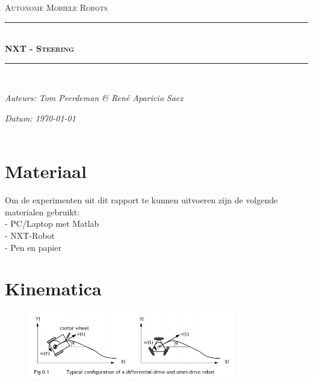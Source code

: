 \documentclass[a4paper]{article}
\newcommand{\HRule}{\rule{\linewidth}{0.5mm}}
\begin{document}
\begin{titlepage}
\begin{center}
\textsc{\Large Autonome Mobiele Robots}\\[0.5cm]
\HRule \\[0,4cm]
\textsc{\huge \bfseries NXT - Steering}
\HRule \\[8cm]
\begin{minipage}{0.4\textwidth}
\begin{flushleft}\large
\emph{Auteurs: Tom Peerdeman \& Ren\'e Aparicio Saez}\\
\end{flushleft}
\end{minipage}
\begin{minipage}{0.4\textwidth}
\begin{flushright}\large
\emph{Datum: \today\\\hspace{1cm}}\\
\end{flushright}
\end{minipage}
\end{center}
\end{titlepage}

\section{Materiaal}
Om de experimenten uit dit rapport te kunnen uitvoeren zijn de volgende materialen gebruikt:\\
- PC/Laptop met Matlab\\
- NXT-Robot\\
- Pen en papier
\section{Kinematica}
\begin{figure}[h]
	\centering
	\includegraphics[width=0.8\textwidth]{imgs/robots.png}
	\label{fig:lineairverband}
\end{figure}
\end{document}
